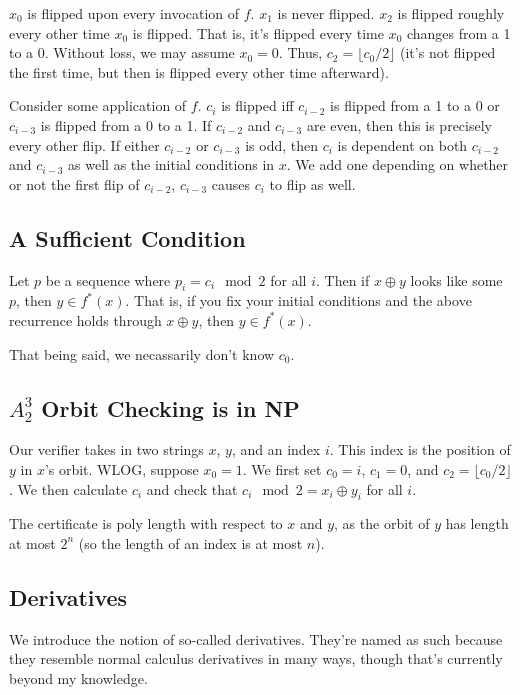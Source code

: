 \documentclass{article}
\newcommand{\0}{\underline{0}}
\newcommand{\1}{\underline{1}}
\newcommand{\2}{\underline{2}}
\begin{document}
$x_0$ is flipped upon every invocation of $f$. $x_1$ is never flipped. $x_2$ is flipped roughly every other time $x_0$ is flipped. That is, it's flipped every time $x_0$ changes from a 1 to a 0. Without loss, we may assume $x_0 = 0$. Thus, $c_2 = \lfloor c_0 / 2 \rfloor$ (it's not flipped the first time, but then is flipped every other time afterward).

Consider some application of $f$. $c_i$ is flipped iff $c_{i-2}$ is flipped from a 1 to a 0 or $c_{i-3}$ is flipped from a 0 to a 1. If $c_{i-2}$ and $c_{i-3}$ are even, then this is precisely every other flip. If either $c_{i-2}$ or $c_{i-3}$ is odd, then $c_i$ is dependent on both $c_{i-2}$ and $c_{i-3}$ as well as the initial conditions in $x$. We add one depending on whether or not the first flip of $c_{i-2}$, $c_{i-3}$ causes $c_i$ to flip as well.

\subsection*{A Sufficient Condition}
Let $p$ be a sequence where $p_i = c_i \mod{2}$ for all $i$. Then if $x \oplus y$ looks like some $p$, then $y \in f^*(x)$. That is, if you fix your initial conditions and the above recurrence holds through $x \oplus y$, then $y \in f^*(x)$.

That being said, we necassarily don't know $c_0$.

\subsection*{$A^3_2$ Orbit Checking is in NP}
Our verifier takes in two strings $x$, $y$, and an index $i$. This index is the position of $y$ in $x$'s orbit. WLOG, suppose $x_0 = 1$. We first set $c_0 = i$, $c_1 = 0$, and $c_2 = \lfloor c_0 / 2 \rfloor$. We then calculate $c_i$ and check that $c_i \mod 2 = x_i \oplus y_i$ for all $i$.

The certificate is poly length with respect to $x$ and $y$, as the orbit of $y$ has length at most $2^n$ (so the length of an index is at most $n$).



\subsection*{Derivatives}
We introduce the notion of so-called derivatives. They're named as such because they resemble normal calculus derivatives in many ways, though that's currently beyond my knowledge.
\end{document}
